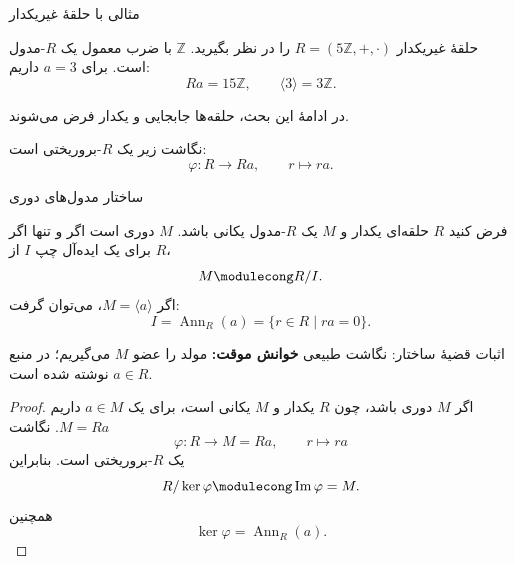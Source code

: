\begin{frame}{مثالی با حلقهٔ غیریکدار}
    \label{lec04:nonunital-example}
    \begin{example}
        حلقهٔ غیریکدار $R=(5\mathbb Z,+,\cdot)$ را در نظر بگیرید.
        $\mathbb Z$ با ضرب معمول یک $R$-مدول است. برای $a=3$ داریم:
        \[
            Ra=15\mathbb Z,\qquad \langle3\rangle=3\mathbb Z.
        \]
    \end{example}
    در ادامهٔ این بحث، حلقه‌ها جابجایی و یکدار فرض می‌شوند.
    \begin{remark}
        نگاشت زیر یک $R$-بروریختی است:
        \[
            \varphi:R\longrightarrow Ra,\qquad r\longmapsto ra.
        \]
    \end{remark}
\end{frame}

\begin{frame}{ساختار مدول‌های دوری}
    \label{lec04:cyclic-structure}
    \begin{theorem}
        فرض کنید $R$ حلقه‌ای یکدار و $M$ یک $R$-مدول یکانی باشد.
        $M$ دوری است اگر و تنها اگر برای یک ایده‌آل چپ $I$ از $R$،
        \[
            M\modulecong R/I.
        \]
        اگر $M=\langle a\rangle$، می‌توان گرفت:
        \[
            I=\operatorname{Ann}_R(a)=\{r\in R\mid ra=0\}.
        \]
    \end{theorem}
\end{frame}

\begin{frame}{اثبات قضیهٔ ساختار: نگاشت طبیعی}
    \label{lec04:cyclic-proof-forward}
    \textbf{خوانش موقت:} مولد را عضو $M$ می‌گیریم؛ در منبع $a\in R$
    نوشته شده است. \lr{[L04-Q02]}

    \begin{proof}
        اگر $M$ دوری باشد، چون $R$ یکدار و $M$ یکانی است،
        برای یک $a\in M$ داریم $M=Ra$.
        نگاشت
        \[
            \varphi:R\longrightarrow M=Ra,\qquad r\longmapsto ra
        \]
        یک $R$-بروریختی است. بنابراین
        \[
            R/\ker\varphi\modulecong\operatorname{Im}\varphi=M.
        \]
        همچنین
        \[
            \ker\varphi=\operatorname{Ann}_R(a).
        \]
    \end{proof}
\end{frame}

